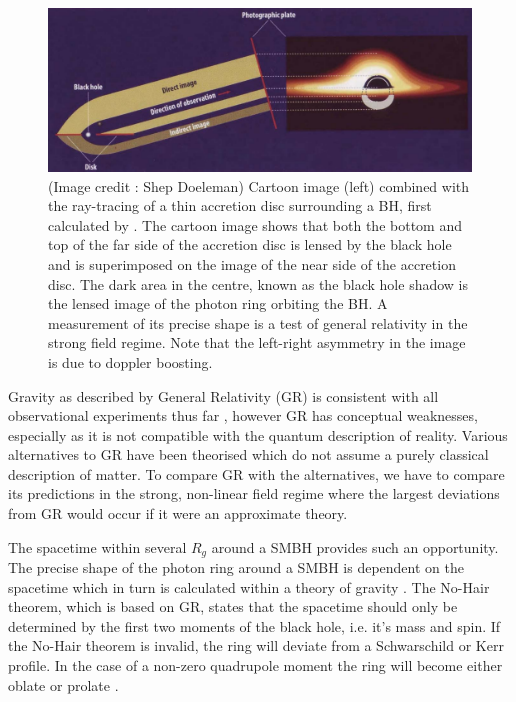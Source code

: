 {\begin{figure}[h!]
\includegraphics[width=\columnwidth]{Images/lensed_cartoon}
\caption{(Image credit : Shep Doeleman) Cartoon image (left) combined with the ray-tracing of a thin accretion disc surrounding a BH, first calculated by \citet{Luminet_1979}. The cartoon image shows that both the bottom and top of the far side of the accretion disc is lensed by the black hole and is superimposed on the image of the near side of the accretion disc. The dark area in the centre, known as the black hole shadow is the lensed image of the photon ring orbiting the BH. A measurement of its precise shape is a test of general relativity in the strong field regime. Note that the left-right asymmetry in the image is due to doppler boosting. \label{fig:grmhd}%
}
\end{figure}


Gravity as described by General Relativity (GR) is consistent with all observational experiments thus far \citep[e.g.][]{Kramer_2006}, however GR has conceptual weaknesses, especially as it is not compatible with the quantum description of reality. Various alternatives to GR have been theorised which do not assume a purely classical description of matter. To compare GR with the alternatives, we have to compare its predictions in the strong, non-linear field regime where the largest deviations from GR would occur if it were an approximate theory.


The spacetime within several $R_g$ around a SMBH provides such an opportunity. The precise shape of the photon ring around a SMBH is dependent on the spacetime which in turn is calculated within a theory of gravity \citep{Takahashi_2004}. The No-Hair theorem, which is based on GR, states that the spacetime should only be determined by the first two moments of the black hole, i.e. it's mass and spin. If the No-Hair theorem is invalid, the ring will deviate from a Schwarschild or Kerr profile. In the case of a non-zero quadrupole moment the ring will become either oblate or prolate \citep{Johannsen_2010}. 

}

